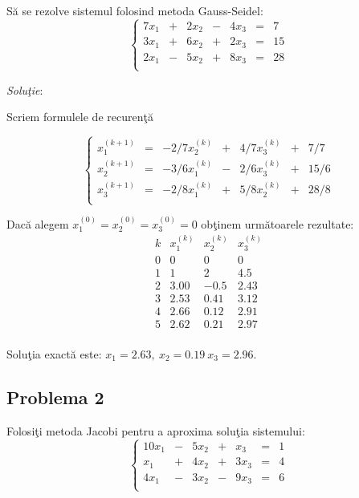 \documentclass{exam}
\begin{document}
S\u{a} se rezolve sistemul folosind metoda Gauss-Seidel:
$$	\left\{
	\begin{array}{ccccccc}
		7x_1 & + & 2x_2 & - & 4x_3 & = & 7  \\
		3x_1 & + & 6x_2 & + & 2x_3 & = & 15 \\
		2x_1 & - & 5x_2 & + & 8x_3 & = & 28 \\
	\end{array} \right.
$$

\textit{Solu\c{t}ie}:

Scriem formulele de recuren\c{t}\u{a}

$$\left\{
	\begin{array}{ccccccccc}
		x_1^{(k+1)} & = & -2/7x_2^{(k)} & + & 4/7x_3^{(k)} & + & 7/7  \\
		x_2^{(k+1)} & = & -3/6x_1^{(k)} & - & 2/6x_3^{(k)} & + & 15/6 \\
		x_3^{(k+1)} & = & -2/8x_1^{(k)} & + & 5/8x_2^{(k)} & + & 28/8 \\
	\end{array} \right.
$$

Dac\u{a} alegem $x_{1}^{(0)} = x_{2}^{(0)}=x_{3}^{(0)}=0$ ob\c{t}inem urm\u{a}toarele rezultate:
$$  \begin{array}{c||ccc}
		k & x_1^{(k)} & x_2^{(k)} & x_3^{(k)} \\
		\hline
		0 & 0         & 0         & 0         \\
		1 & 1         & 2         & 4.5       \\
		2 & 3.00      & -0.5      & 2.43      \\
		3 & 2.53      & 0.41      & 3.12      \\
		4 & 2.66      & 0.12      & 2.91      \\
		5 & 2.62      & 0.21      & 2.97      \\
	\end{array}
$$

Solu\c{t}ia exact\u{a} este: $x_{1}=2.63,\ x_{2}=0.19\ x_{3}=2.96$.

\subsection{Problema 2}
Folosi\c{t}i metoda Jacobi pentru a aproxima solu\c{t}ia sistemului:
$$	\left\{
	\begin{array}{ccccccc}
		10x_1 & - & 5x_2  & + & x_3   & = & 1 \\
		x_1   & + & 4x_2  & + & 3 x_3 & = & 4 \\
		4x_1  & - & 3 x_2 & - & 9x_3  & = & 6 \\
	\end{array} \right.
$$
\end{document}
